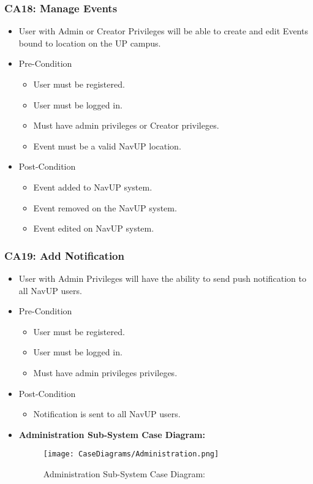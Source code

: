 \documentclass[12pt,a4paper]{article}
\begin{document}
		\subsubsection{CA18: Manage Events}
			\begin{itemize}
				\item User with Admin or Creator Privileges will be able to create and edit Events bound to location on the UP campus.
				\item Pre-Condition
					\begin{itemize}
						\item User must be registered.
						\item User must be logged in.
						\item Must have admin privileges or Creator privileges.
						\item Event must be a valid NavUP location.
					\end{itemize}
				\item Post-Condition
					\begin{itemize}
						\item Event added to NavUP system.
						\item Event removed on the NavUP system.
						\item Event edited on NavUP system.
					\end{itemize}
			\end{itemize}
		\subsubsection{CA19: Add Notification}
			\begin{itemize}
				\item User with Admin Privileges will have the ability to send push notification to all NavUP users.
					\item Pre-Condition
						\begin{itemize}
							\item User must be registered.
							\item User must be logged in.
							\item Must have admin privileges privileges.
						\end{itemize}
					\item Post-Condition
						\begin{itemize}
							\item Notification is sent to all NavUP users.
						\end{itemize}
				\item \textbf{Administration Sub-System Case Diagram:}
				\begin{figure}[H]
					\texttt{[image: CaseDiagrams/Administration.png]}
					\caption{Administration Sub-System Case Diagram:}
				\end{figure}
			\end{itemize}
\end{document}
